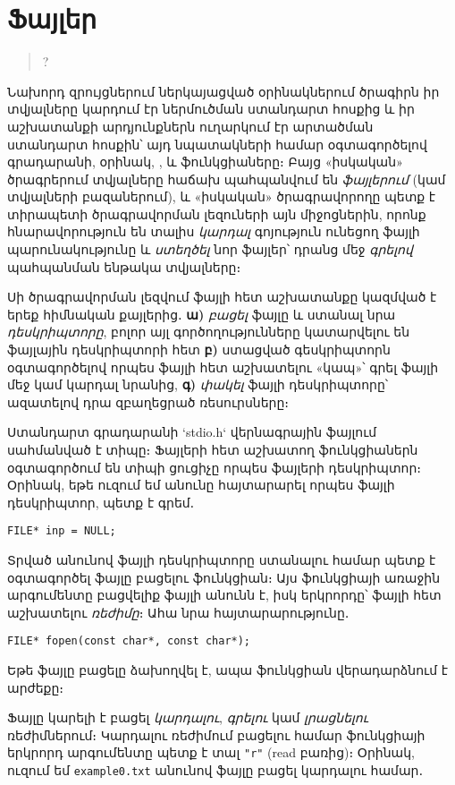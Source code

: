 \chapter{Ֆայլեր}

\begin{quote}
?
\end{quote}

Նախորդ զրույցներում ներկայացված օրինակներում ծրագիրն իր
տվյալները կարդում էր ներմուծման ստանդարտ հոսքից և իր
աշխատանքի արդյունքներն ուղարկում էր արտածման ստանդարտ
հոսքին՝ այդ նպատակների համար օգտագործելով 
գրադարանի, օրինակ, ,  և
 ֆունկցիաները։ Բայց «իսկական» ծրագրերում
տվյալները հաճախ պահպանվում են \emph{ֆայլերում} (կամ տվյալների
բազաներում), և «իսկական» ծրագրավորողը պետք է տիրապետի
ծրագրավորման լեզուների այն միջոցներին, որոնք հնարավորություն
են տալիս \emph{կարդալ} գոյություն ունեցող ֆայլի պարունակությունը
և \emph{ստեղծել} նոր ֆայլեր՝ դրանց մեջ \emph{գրելով} պահպանման
ենթակա տվյալները։

Սի ծրագրավորման լեզվում ֆայլի հետ աշխատանքը կազմված է երեք
հիմնական քայլերից․ \textbf{ա)} \emph{բացել} ֆայլը և ստանալ նրա
\emph{դեսկրիպտորը}, բոլոր այլ գործողությունները կատարվելու են
ֆայլային դեսկրիպտորի հետ \textbf{բ)} ստացված գեսկրիպտորն
օգտագործելով որպես ֆայլի հետ աշխատելու «կապ»՝ գրել ֆայլի մեջ
կամ կարդալ նրանից, \textbf{գ)} \emph{փակել} ֆայլի դեսկրիպտորը՝
ազատելով դրա զբաղեցրած ռեսուրսները։

Ստանդարտ գրադարանի `stdio.h` վերնագրային ֆայլում սահմանված
է  տիպը։ Ֆայլերի հետ աշխատող ֆունկցիաներն օգտագործում
են  տիպի ցուցիչը որպես ֆայլերի դեսկրիպտոր։ Օրինակ,
եթե ուզում եմ  անունը հայտարարել որպես ֆայլի դեսկրիպտոր,
պետք է գրեմ․

\begin{Verbatim}
FILE* inp = NULL;
\end{Verbatim}

Տրված անունով ֆայլի դեսկրիպտորը ստանալու համար պետք է օգտագործել
ֆայլը բացելու  ֆունկցիան։ Այս ֆունկցիայի առաջին
արգումենտը բացվելիք ֆայլի անունն է, իսկ երկրորդը՝ ֆայլի հետ
աշխատելու \emph{ռեժիմը}։ Ահա նրա հայտարարությունը․

\begin{Verbatim}
FILE* fopen(const char*, const char*);
\end{Verbatim}

Եթե ֆայլը բացելը ձախողվել է, ապա  ֆունկցիան վերադարձնում
է  արժեքը։

Ֆայլը կարելի է բացել \emph{կարդալու}, \emph{գրելու} կամ
\emph{լրացնելու} ռեժիմներում։ Կարդալու ռեժիմում բացելու համար
 ֆունկցիայի երկրորդ արգումենտը պետք է տալ \Verb|"r"|
(read բառից)։ Օրինակ, ուզում եմ \texttt{example0.txt} անունով
ֆայլը բացել կարդալու համար․

